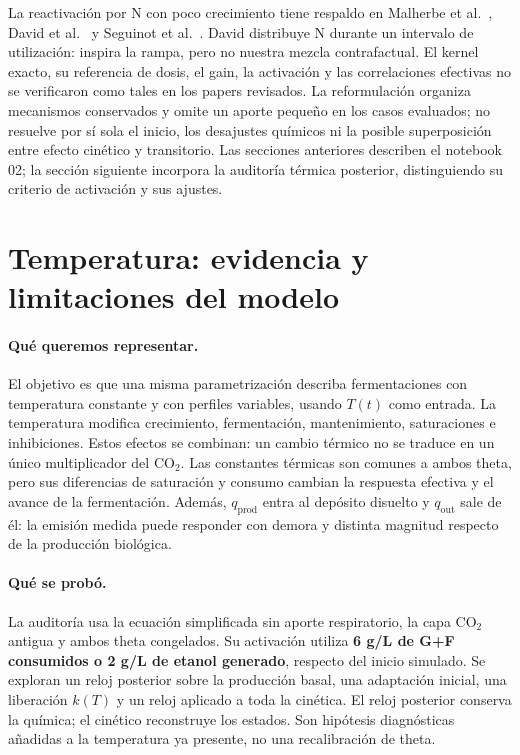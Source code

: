 \documentclass[10pt,a4paper]{article}
\newcommand{\code}[1]{\path{#1}}
\begin{document}
La reactivación por N con poco crecimiento tiene respaldo en
Malherbe et al.~\cite{malherbe}, David et al.~\cite{david} y
Seguinot et al.~\cite{seguinot}. David distribuye N durante un intervalo de
utilización: inspira la rampa, pero no nuestra mezcla contrafactual.
El kernel exacto, su referencia de dosis, el gain, la activación y las
correlaciones efectivas no se verificaron como tales en los papers revisados.
La reformulación organiza mecanismos conservados y omite un aporte pequeño
en los casos evaluados; no resuelve por sí sola el inicio, los desajustes
químicos ni la posible superposición entre efecto cinético y transitorio.
Las secciones anteriores describen el notebook 02; la sección siguiente incorpora
la auditoría térmica posterior, distinguiendo su criterio de activación y sus ajustes.


\clearpage
\section{Temperatura: evidencia y limitaciones del modelo}

\paragraph{Qué queremos representar.}
El objetivo es que una misma parametrización describa fermentaciones con
temperatura constante y con perfiles variables, usando $T(t)$ como entrada.
La temperatura modifica crecimiento, fermentación, mantenimiento,
saturaciones e inhibiciones. Estos efectos se combinan: un cambio térmico no
se traduce en un único multiplicador del CO$_2$. Las constantes térmicas son
comunes a ambos theta, pero sus diferencias de saturación y consumo cambian
la respuesta efectiva y el avance de la fermentación.
Además, $q_{\mathrm{prod}}$ entra al depósito disuelto y $q_{\mathrm{out}}$
sale de él: la emisión medida puede responder con demora y distinta
magnitud respecto de la producción biológica.

\paragraph{Qué se probó.}
La auditoría \code{lab019_021_co2_temperature_shape_audit} usa la ecuación
simplificada sin aporte respiratorio, la capa CO$_2$ antigua y ambos theta
congelados. Su activación utiliza \textbf{6 g/L de G+F consumidos o 2 g/L de
etanol generado}, respecto del inicio simulado. Se exploran un reloj posterior
sobre la producción basal, una adaptación inicial, una liberación $k(T)$ y
un reloj aplicado a toda la cinética. El reloj posterior conserva la química;
el cinético reconstruye los estados. Son hipótesis diagnósticas añadidas a
la temperatura ya presente, no una recalibración de theta.
\end{document}
